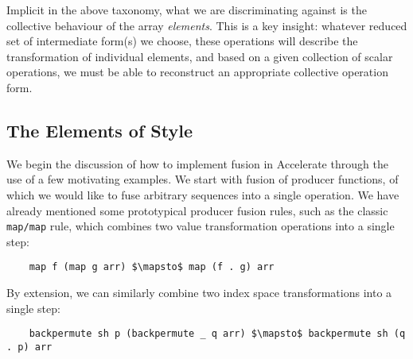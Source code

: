Implicit in the above taxonomy, what we are discriminating against is the
collective behaviour of the array \emph{elements}. This is a key insight:
whatever reduced set of intermediate form(s) we choose, these operations will
describe the transformation of individual elements, and based on a given
collection of scalar operations, we must be able to reconstruct an appropriate
collective operation form.


\subsection{The Elements of Style}
\label{sec:elements_of_style}

We begin the discussion of how to implement fusion in Accelerate through the use
of a few motivating examples. We start with fusion of producer functions, of
which we would like to fuse arbitrary sequences into a single operation. We have
already mentioned some prototypical producer fusion rules, such as the classic
\texttt{map/map} rule, which combines two value transformation operations into a
single step:
%
\begin{lstlisting}[style=haskell,numbers=none,mathescape]
%\bf$\langle$ RULE: map/map $\rangle$%
    map f (map g arr) $\mapsto$ map (f . g) arr
\end{lstlisting}
%
By extension, we can similarly combine two index space transformations into a
single step:
%
\begin{lstlisting}[style=haskell,numbers=none,mathescape]
%\bf$\langle$ RULE: backpermute/backpermute $\rangle$%
    backpermute sh p (backpermute _ q arr) $\mapsto$ backpermute sh (q . p) arr
\end{lstlisting}

